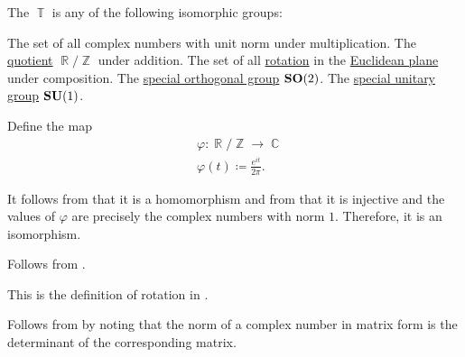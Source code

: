 \begin{definition}\label{def:circle_group}\mimprovised
  The  \( \BbbT \) is any of the following isomorphic groups:
  \begin{thmenum}
     The set of all complex numbers with unit norm under multiplication.
     The \hyperref[def:group/quotient]{quotient} \( \BbbR / \BbbZ \) under addition.
     The set of all \hyperref[def:rigid_motion/rotation]{rotation} in the \hyperref[def:euclidean_plane]{Euclidean plane} under composition.
     The \hyperref[def:unitary_groups]{special orthogonal group} \( \grp{SO}(2) \).
     The \hyperref[def:unitary_groups]{special unitary group} \( \grp{SU}(1) \).
  \end{thmenum}
\end{definition}
\begin{defproof}
   Define the map
  \begin{equation*}
    \begin{aligned}
      &\varphi: \BbbR / \BbbZ \to \BbbC \\
      &\varphi(t) \coloneqq \frac {e^{it}} {2\pi}.
    \end{aligned}
  \end{equation*}

  It follows from  that it is a homomorphism and from  that it is injective and the values of \( \varphi \) are precisely the complex numbers with norm \( 1 \). Therefore, it is an isomorphism.

   Follows from .

   This is the definition of rotation in .

   Follows from  by noting that the norm of a complex number in matrix form is the determinant of the corresponding matrix.
\end{defproof}

